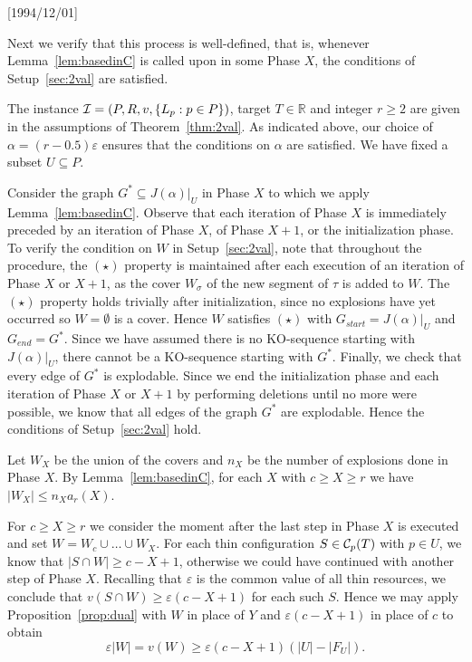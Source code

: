 \NeedsTeXFormat{LaTeX2e}[1994/12/01]\documentclass[letterpaper, 11pt]{article}
\theoremstyle{definition}
\theoremstyle{remark}
\numberwithin{equation}{section}
\newcommand{\veps}{\varepsilon}
\begin{document}
Next we verify that this process is well-defined, that is,
whenever Lemma~\ref{lem:basedinC} is called upon in
some Phase $X$, the conditions of Setup~\ref{sec:2val} are satisfied.

The instance ${\cal I} = (P, R , v, \{L_p : p\in P\})$, target $T\in \mathbb{R}$
and integer $r\geq 2$ are given in the assumptions of
Theorem~\ref{thm:2val}. As indicated above, our choice of $\alpha=(r-0.5)\veps$ ensures that
the conditions on $\alpha$ are satisfied. We have fixed a subset
$U\subseteq P$.

Consider the graph $G^*\subseteq J(\alpha)|_U$ in Phase $X$ to
which we apply Lemma~\ref{lem:basedinC}. Observe that each iteration
of Phase $X$ is immediately preceded by an 
iteration of Phase $X$, of Phase $X+1$, or the initialization
phase. To verify the condition on $W$ in
Setup~\ref{sec:2val}, note that throughout the procedure, the $(\star)$ property
is maintained after each execution of an iteration of Phase $X$ or $X+1$, as
the cover $W_{\sigma}$ of the new segment of $\tau$ is added to
$W$. The $(\star)$ property holds trivially after initialization,
since no explosions 
have yet occurred so $W=\emptyset$ is a cover. Hence $W$ satisfies $(\star)$
with $G_{start}=J(\alpha)|_U$ and $G_{end}=G^*$. Since we have assumed there is
no KO-sequence starting with $J(\alpha)|_U$, there cannot be a
KO-sequence starting with $G^*$. Finally, we check that every edge of
$G^*$ is explodable. Since we end the initialization phase and each
iteration of Phase $X$ or $X+1$ by performing deletions until no more were
possible, we know that all edges of the graph $G^*$ are explodable. Hence the conditions of Setup~\ref{sec:2val} hold.



Let $W_X$ be the union of the covers and $n_X$ be the 
number of explosions done in Phase $X$.
By Lemma~\ref{lem:basedinC},
for each $X$ with 
$c\geq X\geq r$ we have $|W_X|\leq n_Xa_r(X)$.

For $c\geq X \geq r$ we consider the moment 
after the last step in Phase $X$ is 
executed and set $W=W_c\cup\ldots\cup W_X$. 
For each thin configuration $S\in {\cal C}_p(T)$
with $p\in U$, we know that $|S\cap W|\geq c-X+1$,
otherwise we could have continued with another step of Phase $X$. 
Recalling that
  $\varepsilon$ is the common value of all thin resources, we conclude that $v(S\cap W)\geq\varepsilon(c-X+1)$
for each such $S$. Hence we may
  apply Proposition~\ref{prop:dual} with $W$ in place of $Y$ and
  $\varepsilon(c-X+1)$ in place of $c$ to obtain
  $$\varepsilon|W|=v(W)\geq\varepsilon(c-X+1)(|U|-|F_U|).$$
\end{document}
